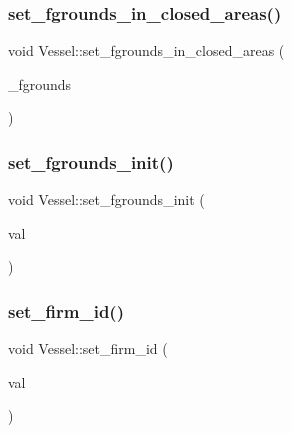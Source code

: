 \mbox{\label{class_vessel_a77a3040c6eded10488aba63d99bd461d}} 
\subsubsection{\texorpdfstring{set\_fgrounds\_in\_closed\_areas()}{set\_fgrounds\_in\_closed\_areas()}}
{\footnotesize\ttfamily void Vessel\+::set\+\_\+fgrounds\+\_\+in\+\_\+closed\+\_\+areas (\begin{DoxyParamCaption}\item[{const vector$<$ \mbox{\hyperlink{classtypes_1_1_node_id}{types\+::\+Node\+Id}} $>$ \&}]{\+\_\+fgrounds }\end{DoxyParamCaption})}

\mbox{\label{class_vessel_a86ee928c33c66f108bf00e0d97a69edc}} 
\subsubsection{\texorpdfstring{set\_fgrounds\_init()}{set\_fgrounds\_init()}}
{\footnotesize\ttfamily void Vessel\+::set\+\_\+fgrounds\+\_\+init (\begin{DoxyParamCaption}\item[{int}]{val }\end{DoxyParamCaption})}

\mbox{\label{class_vessel_ab08e5d4629d18a4e9234606a65679e11}} 
\subsubsection{\texorpdfstring{set\_firm\_id()}{set\_firm\_id()}}
{\footnotesize\ttfamily void Vessel\+::set\+\_\+firm\+\_\+id (\begin{DoxyParamCaption}\item[{int}]{val }\end{DoxyParamCaption})}

\mbox{\label{class_vessel_ad5e2ac561d3d800fb01176d70535ff93}} 
